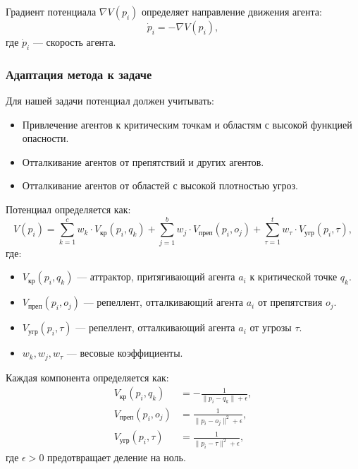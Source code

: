 Градиент потенциала $\nabla V(p_i)$ определяет направление движения агента:
\begin{equation}
	\dot{p}_i = -\nabla V(p_i),
\end{equation}
где $\dot{p}_i$ — скорость агента.

\subsubsection*{Адаптация метода к задаче}
Для нашей задачи потенциал должен учитывать:
\begin{itemize}
	\item Привлечение агентов к критическим точкам и областям с высокой функцией опасности.
	\item Отталкивание агентов от препятствий и других агентов.
	\item Отталкивание агентов от областей с высокой плотностью угроз.
\end{itemize}

Потенциал определяется как:
\begin{equation}
	V(p_i) = \sum_{k=1}^{c} w_k \cdot V_{\text{кр}}(p_i, q_k) + \sum_{j=1}^{b} w_j \cdot V_{\text{преп}}(p_i, o_j) + \sum_{\tau=1}^{t} w_\tau \cdot V_{\text{угр}}(p_i, \tau),
\end{equation}
где:  
\begin{itemize}
	\item $V_{\text{кр}}(p_i, q_k)$ — аттрактор, притягивающий агента $a_i$ к критической точке $q_k$.
	\item $V_{\text{преп}}(p_i, o_j)$ — репеллент, отталкивающий агента $a_i$ от препятствия $o_j$.
	\item $V_{\text{угр}}(p_i, \tau)$ — репеллент, отталкивающий агента $a_i$ от угрозы $\tau$.
	\item $w_k, w_j, w_\tau$ — весовые коэффициенты.
\end{itemize}

Каждая компонента определяется как:
\begin{align}
	V_{\text{кр}}(p_i, q_k) &= -\frac{1}{\|p_i - q_k\| + \epsilon}, \\
	V_{\text{преп}}(p_i, o_j) &= \frac{1}{\|p_i - o_j\|^2 + \epsilon}, \\
	V_{\text{угр}}(p_i, \tau) &= \frac{1}{\|p_i - \tau\|^2 + \epsilon},
\end{align}
где $\epsilon > 0$ предотвращает деление на ноль.

